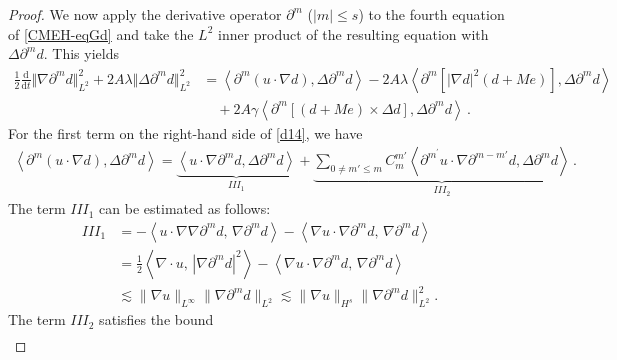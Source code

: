 \documentclass[reqno,11pt]{amsart}
\numberwithin{equation}{section}
\def\d{\mathrm{d}}
\begin{document}
\begin{proof}

We now apply the derivative operator $\partial^m$ ($|m|\le s$) to the fourth equation of \eqref{CMEH-eqGd} and take the $L^2$ inner product of the resulting equation with $\Delta\partial^m d$. This yields
\begin{equation}\label{d14}
\begin{aligned}
\frac{1}{2} \frac{\d}{\d t} \Vert \nabla \partial^m d \Vert_{L^2}^2 + 2A \lambda \Vert \Delta \partial^m d \Vert_{L^2}^2 & = \left\langle \partial^m (u \cdot \nabla d), \Delta \partial^m d \right\rangle - 2A \lambda \left\langle \partial^m \left[ |\nabla d|^2 (d + M e) \right], \Delta \partial^m d \right\rangle \\
& \quad + 2A \gamma \left\langle \partial^m \left[ (d + M e) \times \Delta d \right], \Delta \partial^m d \right\rangle \,.
\end{aligned}
\end{equation}
For the first term on the right-hand side of \eqref{d14}, we have
\begin{equation*}
\begin{aligned}
\left\langle \partial^m (u \cdot \nabla d), \Delta \partial^m d \right\rangle =\underset{III_1}{\underbrace{ \left\langle u \cdot \nabla \partial^m d, \Delta \partial^m d \right\rangle}} +\underset{III_2}{\underbrace{ \sum_{0 \neq m' \leq m} C_m^{m'} \left\langle \partial^{m^\prime} u \cdot \nabla \partial^{m-m'} d, \Delta \partial^m d \right\rangle}} \,.
\end{aligned}
\end{equation*}
The term $III_1$ can be estimated as follows:
\begin{equation*}
\begin{aligned}
III_1 & = -\left\langle u \cdot \nabla \nabla \partial^m d,\, \nabla \partial^m d \right\rangle - \left\langle \nabla u \cdot \nabla \partial^m d,\, \nabla \partial^m d \right\rangle \\
&= \frac{1}{2}\left\langle \nabla \cdot u,\, |\nabla \partial^m d|^2 \right\rangle - \left\langle \nabla u \cdot \nabla \partial^m d,\, \nabla \partial^m d \right\rangle \\
&\lesssim \| \nabla u \|_{L^\infty} \| \nabla \partial^m d \|_{L^2} \lesssim \| \nabla u \|_{H^s} \| \nabla \partial^m d \|_{L^2}^2. 
\end{aligned}
\end{equation*}
The term $III_2$ satisfies the bound
\begin{equation*}
\begin{aligned}

\end{aligned}
\end{equation*}
\end{proof}
\end{document}
